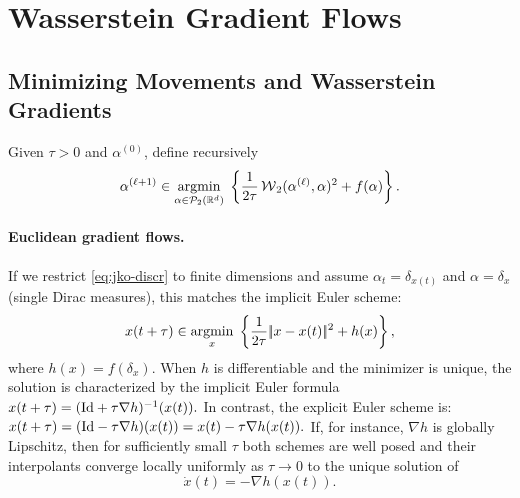 \section{Wasserstein Gradient Flows}
\label{sec-wasserstein-gradient-flows}
\subsection{Minimizing Movements and Wasserstein Gradients}
\begin{defn}\label{def-jko-minimizing-movement}
Given $\tau>0$ and $\alpha^{(0)}$, define recursively
\begin{equation}
\alpha^{(\ell+1)} \in \underset{\alpha\in\mathcal{P}_2(\mathbb{R}^d)}{\operatorname{argmin}}\;
\left\{\frac{1}{2 \tau} \operatorname{\mathcal{W}}_2(\alpha^{(\ell)}, \alpha)^2 + f(\alpha)\right\}. \label{eq:jko-discr}
\end{equation}
\end{defn}
\paragraph{Euclidean gradient flows.}
If we restrict \eqref{eq:jko-discr} to finite dimensions and assume $\alpha_t = \delta_{x(t)}$ and $\alpha = \delta_x$ (single Dirac measures), this matches the implicit Euler scheme:
\begin{equation*}
x(t+\tau) \in \underset{x}{\operatorname{argmin}}\;\left\{\frac{1}{2 \tau} |\!| x - x(t) |\!|^2 + h(x)\right\},
\end{equation*}
where $h(x) = f(\delta_x)$. When $h$ is differentiable and the minimizer is unique, the solution is characterized by the implicit Euler formula
\(x(t+\tau) = (\mathrm{Id} + \tau \nabla h)^{-1}(x(t)).\)
In contrast, the explicit Euler scheme is: \(x(t+\tau) = (\mathrm{Id} - \tau \nabla h)(x(t)) = x(t) - \tau \nabla h(x(t)).\)
If, for instance, $\nabla h$ is globally Lipschitz, then for sufficiently small $\tau$ both schemes are well posed and their interpolants converge locally uniformly as $\tau\to0$ to the unique solution of
\begin{equation}
\dot{x}(t) = -\nabla h(x(t)). \label{eq:grad-flow-classical}
\end{equation}
